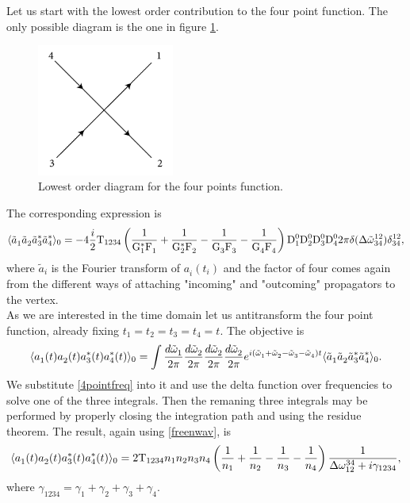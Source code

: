 Let us start with the lowest order contribution to the four point function. The only possible diagram is the one in figure \ref{fig:treefourpoints}.
\begin{figure}[ht]
    \centering
    \includegraphics[width=0.4\textwidth]{images/quarticvertex.jpg}
    \caption{Lowest order diagram for the four points function.}
    \label{fig:treefourpoints}
\end{figure}
The corresponding expression is
\begin{equation}
    \langle \tilde{a}_1^{} \tilde{a}_2^{} \tilde{a}_3^{*}\tilde{a}_4^{*} \rangle_{0} = -4\frac{i}{2} \mathrm{T}_{1234}\left(\dfrac{1}{\mathrm{G}_1^*\mathrm{F}_1^{}}+\dfrac{1}{\mathrm{G}_2^*\mathrm{F}_2^{}}-\dfrac{1}{\mathrm{G}_3^{}\mathrm{F}_3^{}}
    -\dfrac{1}{\mathrm{G}_4^{}\mathrm{F}_4^{}}\right)\mathrm{D}_1^0\mathrm{D}_2^0\mathrm{D}_3^0\mathrm{D}_4^0 2\pi \delta(\Delta{\tilde{\omega}}^{12}_{34})\delta^{12}_{34},
    \label{4pointfreq}
\end{equation}
where $\tilde{a}_i^{}$ is the Fourier transform of $a_i^{}(t_i)$ and the factor of four comes again from the different ways of attaching "incoming" and "outcoming" 
propagators to the vertex.\\
As we are interested in the time domain let us antitransform the four point function, already fixing $t_1 = t_2 = t_3 = t_4 = t$. The objective is
\begin{equation}
    \langle a_1^{}(t) a_2^{}(t) a_3^{*}(t) a_4^{*}(t) \rangle_0 = \int \frac{d\tilde{\omega}^{}_1}{2\pi}\frac{d\tilde{\omega}^{}_2}{2\pi}\frac{d\tilde{\omega}^{}_2}{2\pi}\frac{d\tilde{\omega}^{}_2}{2\pi}
    e^{i(\tilde{\omega}^{}_1 + \tilde{\omega}^{}_2  -\tilde{\omega}^{}_3 - \tilde{\omega}^{}_4)t} \langle \tilde{a}_1^{} \tilde{a}_2^{} \tilde{a}_3^{*}\tilde{a}_4^{*} \rangle_{0}.
    \label{antitransform4}
\end{equation}
We substitute \eqref{4pointfreq} into it and use the delta function over frequencies to solve one of the three integrals. Then the remaning three integrals may 
be performed by properly closing the integration path and using the residue theorem. The result, again using \eqref{freenwav}, is
\begin{equation}
    \langle a_1^{}(t) a_2^{}(t) a_3^{*}(t) a_4^{*}(t) \rangle_0 = 2\mathrm{T}_{1234}n_1 n_2 n_3 n_4\left( \frac{1}{n_1}+\frac{1}{n_2}-\frac{1}{n_3}-\frac{1}{n_4} \right)
    \frac{1}{\Delta{\omega}^{34}_{12} + i\gamma_{1234}},
    \label{fourpointtree}
\end{equation}  
where $\gamma_{1234} = \gamma_1 + \gamma_2 + \gamma_3 + \gamma_4$. \\

